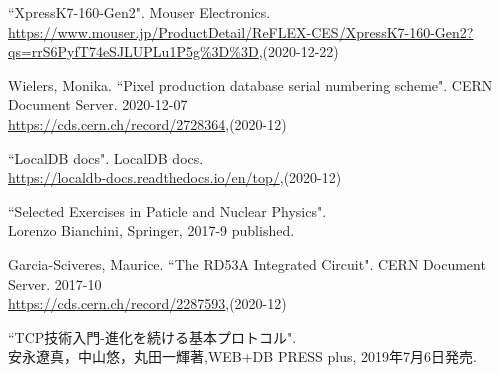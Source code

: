 \begin{thebibliography}{9}
``XpressK7-160-Gen2". Mouser Electronics.\\
\url{https://www.mouser.jp/ProductDetail/ReFLEX-CES/XpressK7-160-Gen2?qs=rrS6PyfT74eSJLUPLu1P5g\%3D\%3D},(2020-12-22)

Wielers, Monika. ``Pixel production database serial numbering scheme". CERN Document Server. 2020-12-07\\
\url{https://cds.cern.ch/record/2728364},(2020-12)

``LocalDB docs". LocalDB docs. \\
\url{https://localdb-docs.readthedocs.io/en/top/},(2020-12)

``Selected Exercises in Paticle and Nuclear Physics".\\
Lorenzo Bianchini, Springer, 2017-9 published.

Garcia-Sciveres, Maurice. ``The RD53A Integrated Circuit". CERN Document Server. 2017-10\\
\url{https://cds.cern.ch/record/2287593},(2020-12)

``TCP技術入門-進化を続ける基本プロトコル".\\
安永遼真，中山悠，丸田一輝著,WEB+DB PRESS plus, 2019年7月6日発売.

\end{thebibliography}
